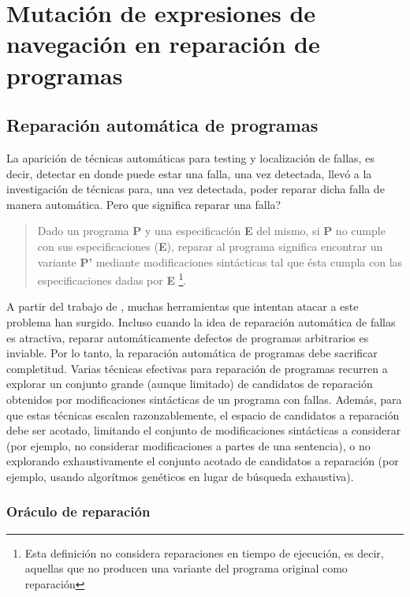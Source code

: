 \chapter{Mutaci\'on de expresiones de navegaci\'on en reparaci\'on de programas}
\label{cap:repair}

\section{Reparaci\'on autom\'atica de programas}
\label{sec:repair}

La aparici\'on de t\'ecnicas autom\'aticas para testing y localizaci\'on de fallas, es decir, detectar en donde puede estar una falla, una vez detectada, llev\'o a la investigaci\'on de t\'ecnicas para, una vez detectada, poder reparar dicha falla de manera autom\'atica. Pero que significa reparar una falla?
\begin{quote}
	Dado un programa \textbf{P} y una especificaci\'on \textbf{E} del mismo, si \textbf{P} no cumple con sus especificaciones (\textbf{E}), reparar al programa significa encontrar un variante \textbf{P'} mediante modificaciones sint\'acticas tal que \'esta cumpla con las especificaciones dadas por \textbf{E} \footnote{Esta definici\'on no considera reparaciones en tiempo de ejecuci\'on, es decir, aquellas que no producen una variante del programa original como reparaci\'on}.
\end{quote}
A partir del trabajo de \cite{bibliography.repair.ArcuriY08}, muchas herramientas que intentan atacar a este problema han surgido. Incluso cuando la idea de reparaci\'on autom\'atica de fallas es atractiva, reparar autom\'aticamente defectos de programas arbitrarios es inviable. Por lo tanto, la reparaci\'on autom\'atica de programas debe sacrificar completitud. Varias t\'ecnicas efectivas para reparaci\'on de programas recurren a explorar un conjunto grande (aunque limitado) de candidatos de reparaci\'on obtenidos por modificaciones sint\'acticas de un programa con fallas. Adem\'as, para que estas t\'ecnicas escalen razonzablemente, el espacio de candidatos a reparaci\'on debe ser acotado, limitando el conjunto de modificaciones sint\'acticas a considerar (por ejemplo, no considerar modificaciones a partes de una sentencia), o no explorando exhaustivamente el conjunto acotado de candidatos a reparaci\'on (por ejemplo, usando algor\'itmos gen\'eticos en lugar de b\'usqueda exhaustiva).

\subsection{Or\'aculo de reparaci\'on}
\label{sec:repair.specs}

